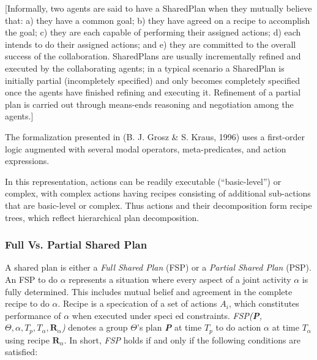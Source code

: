 \documentclass[11pt]{article}
\begin{document}
[Informally, two agents are said to have a SharedPlan when  they mutually
believe that: a) they have a common goal; b) they have agreed on a recipe to accomplish
the goal; c) they are each capable of performing their assigned actions; d) each
intends to do their assigned actions; and e) they are committed to the overall
success of the collaboration. SharedPlans are usually incrementally refined and
executed by the collaborating agents; in a typical scenario a SharedPlan is
initially partial (incompletely specified) and only becomes completely specified
once the agents have finished refining and executing it. Refinement of a partial
plan is carried out through means-ends reasoning and negotiation among the
agents.]

The formalization presented in (B. J. Grosz & S. Kraus, 1996) uses a first-order
logic augmented with several modal operators, meta-predicates, and action
expressions.

In this representation, actions can be readily executable (“basic-level”) or
complex, with complex actions having recipes consisting of additional
sub-actions that are basic-level or complex. Thus actions and their
decomposition form recipe trees, which reflect hierarchical plan decomposition.



\subsubsection{Full Vs. Partial Shared Plan}
A shared plan is either a \textit{Full Shared Plan} (FSP) or a \textit{Partial
Shared Plan} (PSP). An FSP to do $\alpha$ represents a situation where every
aspect of a joint activity $\alpha$ is fully determined. This includes mutual
belief and agreement in the complete recipe to do $\alpha$. Recipe is a
specication of a set of actions \textit{$A_i$}, which constitutes performance of
$\alpha$ when executed under speci ed constraints. \textit{FSP(\textbf{P},
$\Theta, \alpha, T_p, T_\alpha, \textbf{R}_\alpha$)} denotes a group $\Theta$'s
plan \textit{\textbf{P}} at time \textit{$T_p$} to do action $\alpha$ at time
\textit{$T_\alpha$} using recipe \textit{$\textbf{R}_\alpha$}. In short,
\textit{FSP} holds if and only if the following conditions are satisfied:
\end{document}
